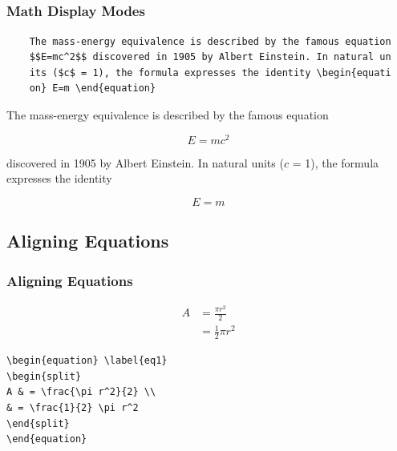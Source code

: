 \documentclass[12pt]{beamer}
\begin{document}
\begin{frame}[shrink=20,fragile]
\section{         }
\frametitle{Math Display Modes}
{\footnotesize \begin{verbatim}
	The mass-energy equivalence is described by the famous equation 
	$$E=mc^2$$ discovered in 1905 by Albert Einstein. In natural un
	its ($c$ = 1), the formula expresses the identity \begin{equati
	on}	E=m	\end{equation}
\end{verbatim}}

	The mass-energy equivalence is described by the famous equation
	
	$$E=mc^2$$
	
	discovered in 1905 by Albert Einstein. 
	In natural units ($c$ = 1), the formula expresses the identity
	
	\begin{equation}
	E=m
	\end{equation}


\end{frame}
\begin{frame}[fragile]
\section{    Aligning Equations    }
\frametitle{Aligning Equations}


\begin{equation} \label{eq1}
\begin{split}
A & = \frac{\pi r^2}{2} \\
& = \frac{1}{2} \pi r^2
\end{split}
\end{equation}

\begin{verbatim}
\begin{equation} \label{eq1}
\begin{split}
A & = \frac{\pi r^2}{2} \\
& = \frac{1}{2} \pi r^2
\end{split}
\end{equation}
\end{verbatim}

\end{frame}
\end{document}
